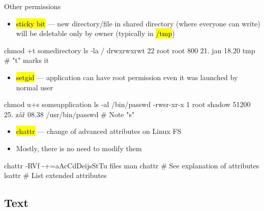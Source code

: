 \documentclass[compress, ucs, xelatex, 11pt, xcolor=svgnames, aspectratio=169,
	hyperref={
		bookmarks=true,
		unicode=true,
		colorlinks=true,
		pdftitle={Linux, command line and MetaCentrum},
		plainpages=false,
		pdfauthor={Vojtech Zeisek},
		pdfsubject={Course about use of Linux command line, writing shell scripts and using MetaCentrum of CESNET},
		pdfcreator={XeLaTeX},
		pdfkeywords={Linux, GNU, BASH, shell, command line, MetaCentrum},
		linkcolor=DarkRed, %
		anchorcolor=DarkBlue, %
		citecolor=Indigo, %
		filecolor=NavyBlue, %
		menucolor=DarkMagenta, %
		urlcolor=DarkBlue, %
		pdftex},
	url={hyphens, lowtilde} %
	]{beamer}
\renewcommand{\texttt}[1]{\hl{\ttfamily #1}}
\begin{document}
\begin{frame}[fragile]{Other permissions}
	\begin{itemize}
		\item \texttt{sticky bit} --- new directory/file in shared directory (where everyone can write) will be deletable only by owner (typically in \texttt{/tmp})
	\end{itemize}
	\vfill
	\begin{bashcode}
    chmod +t somedirectory
    ls -la /
    drwxrwxrwt 22 root root 800 21. jan 18.20 tmp # "t" marks it
	\end{bashcode}
	\vfill
	\begin{itemize}
		\item \texttt{setgid} --- application can have root permission even it was launched by normal user
	\end{itemize}
	\vfill
	\begin{bashcode}
    chmod u+s someapplication
    ls -al /bin/passwd
    -rwsr-xr-x 1 root shadow 51200 25. zář 08.38 /usr/bin/passwd # Note "s"
	\end{bashcode}
	\vfill
	\begin{itemize}
		\item \texttt{chattr} --- change of advanced attributes on Linux FS
		\item Mostly, there is no need to modify them
	\end{itemize}
	\vfill
	\begin{bashcode}
    chattr -RVf -+=aAcCdDeijsStTu files
    man chattr # See explanation of attributes
    lsattr # List extended attributes
	\end{bashcode}
\end{frame}

\subsection{Text}
\end{document}
